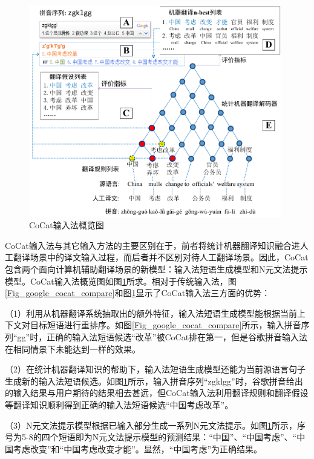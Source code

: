 \begin{figure}[tb]
	\centering
	\includegraphics[width=0.98\textwidth]{Figure/Figure_3_3.pdf}
	\caption{CoCat输入法概览图}
	\label{Fig_cocat_overview}
\end{figure}

CoCat输入法与其它输入方法的主要区别在于，前者将统计机器翻译知识融合进人工翻译场景中的译文输入过程，而后者并不区别对待人工翻译场景。因此，CoCat包含两个面向计算机辅助翻译场景的新模型：输入法短语生成模型和N元文法提示模型。CoCat输入法概览图如图\ref{Fig_cocat_overview}所求。相对于传统输入法，图\ref{Fig_google_cocat_compare}和图\ref{Fig_cocat_overview}显示了CoCat输入法三方面的优势：

（1）利用从机器翻译系统抽取出的额外特征，输入法短语生成模型能根据当前上下文对目标短语进行重排序。如图\ref{Fig_google_cocat_compare}所示，输入拼音序列“gg”时，正确的输入法短语候选“改革”被CoCat排在第一，但是谷歌拼音输入法在相同情景下未能达到一样的效果。

（2）在统计机器翻译知识的帮助下，输入法短语生成模型还能为当前源语言句子生成新的输入法短语候选。如图\ref{Fig_cocat_overview}所示，输入拼音序列“zgklgg”时，谷歌拼音给出的输入结果与用户期待的结果相去甚远，但CoCat输入法利用翻译规则和翻译假设等翻译知识顺利得到正确的输入法短语候选“中国考虑改革”。

（3）N元文法提示模型根据已输入部分生成一系列N元文法提示。如图\ref{Fig_cocat_overview}所示，序号为5-8的四个短语即为N元文法提示模型的预测结果：“中国”、“中国考虑”、“中国考虑改变”和“中国考虑改变才能”。显然，“中国考虑”为正确结果。

